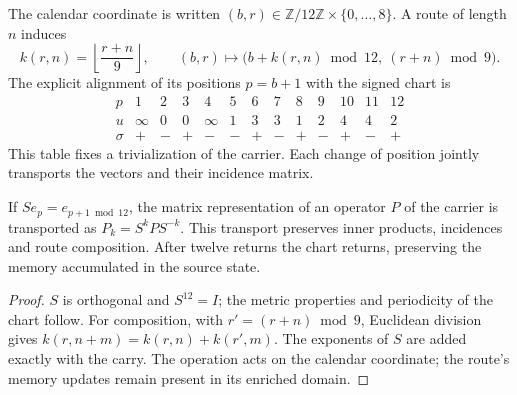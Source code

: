 The calendar coordinate is written \((b,r)\in
\mathbb Z/12\mathbb Z\times\{0,\ldots,8\}\). A route of length \(n\)
induces
\[
 k(r,n)=\left\lfloor\frac{r+n}{9}\right\rfloor,\qquad
 (b,r)\longmapsto
 \bigl(b+k(r,n)\bmod12,\ (r+n)\bmod9\bigr).
\]
The explicit alignment of its positions \(p=b+1\) with the signed chart is
\[
\begin{array}{c|rrrrrrrrrrrr}
p&1&2&3&4&5&6&7&8&9&10&11&12\\ \hline
u&\infty&0&0&\infty&1&3&3&1&2&4&4&2\\
\sigma&+&-&+&-&-&+&-&+&-&+&-&+
\end{array}
\]
This table fixes a trivialization of the carrier. Each change of position
jointly transports the vectors and their incidence matrix.

\begin{proposition}
If \(S e_p=e_{p+1\bmod12}\), the matrix representation of an
operator \(P\) of the carrier is transported as \(P_k=S^kPS^{-k}\).
This transport preserves inner products, incidences and route
composition. After twelve returns the chart returns, preserving the memory
accumulated in the source state.
\end{proposition}
\begin{proof}
\(S\) is orthogonal and \(S^{12}=I\); the metric properties
and periodicity of the chart follow. For composition, with
\(r'=(r+n)\bmod9\), Euclidean division gives
\(k(r,n+m)=k(r,n)+k(r',m)\). The exponents of \(S\) are added
exactly with the carry. The operation acts on the calendar
coordinate; the route's memory updates remain
present in its enriched domain.
\end{proof}

